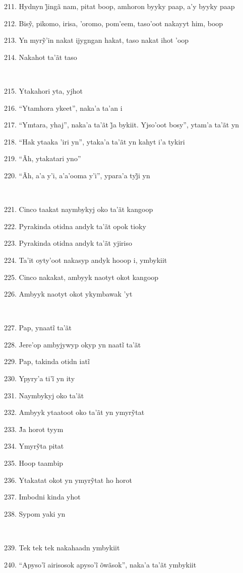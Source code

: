 211. Hydnyn j̃ingã nam, pitat boop, amhoron byyky paap, a’y byyky paap

212. Bisỹ, pikomo, irisa, ’oromo, pom’eem, taso’oot nakayyt him, boop

213. Yn myrỹ’in nakat ijygngan hakat, taso nakat ihot ’oop

214. Nakahot ta'ãt taso

~

215. Ytakahori yta, yjhot

216. ``Ytamhora ykeet'', naka'a ta'an i

217. “Ymtara, yhaj”, naka’a ta’ãt j̃a bykiit. Yjso’oot bosy”, ytam’a ta’ãt yn

218. ``Hak ytaaka 'iri yn'', ytaka'a ta'ãt yn kahyt i'a tykiri

219. ``Ãh, ytakatari yno''

220. “Ãh, a’a y’i, a’a’ooma y’i”, ypara’a tyj̃i yn

~

221. Cinco taakat naymbykyj oko ta'ãt kangoop

222. Pyrakinda otidna andyk ta'ãt opok tioky

223. Pyrakinda otidna andyk ta'ãt yjiriso

224. Ta'it oyty'oot nakasyp andyk hooop i, ymbykiit

225. Cinco nakakat, ambyyk naotyt okot kangoop

226. Ambyyk naotyt okot ykymbawak 'yt

~

227. Pap, ynaatĩ ta’ãt

228. Jere’op ambyjywyp okyp yn naatĩ ta’ãt

229. Pap, takinda otidn iatĩ

230. Ypyry’a ti’ĩ yn ity

231. Naymbykyj oko ta'ãt

232. Ambyyk ytaatoot oko ta’ãt yn ymyrỹtat

233. J̃a horot tyym

234. Ymyrỹta pitat

235. Hoop taambip

236. Ytakatat okot yn ymyrỹtat ho horot

237. Imbodni kinda yhot

238. Sypom yaki yn

~

239. Tek tek tek nakahaadn ymbykiit

240. “Apyso’ĩ airisosok apyso’ĩ õwãsok”, naka’a ta’ãt ymbykiit

